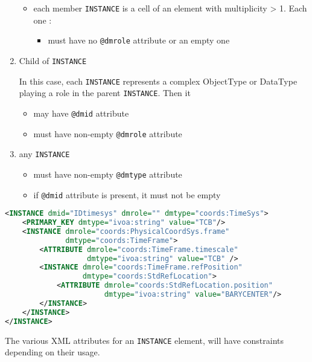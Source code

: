 \begin{enumerate}
\begin{itemize}
     \item each member \texttt{INSTANCE} is a cell of an element with multiplicity > 1.
          Each one :             
           \begin{itemize}
             \item must have no  \texttt{@dmrole} attribute or an empty one
           \end{itemize}
  \end{itemize}  
    
\item Child of \texttt{INSTANCE}

     In this case, each \texttt{INSTANCE} represents 
     a complex ObjectType or DataType playing a role in the parent \texttt{INSTANCE}.
     Then it     
     \begin{itemize}
        \item may have  \texttt{@dmid} attribute
        \item must have non-empty  \texttt{@dmrole} attribute
     \end{itemize}
           
\item any \texttt{INSTANCE}

   \begin{itemize}
   	 \item must have non-empty  \texttt{@dmtype} attribute
	 \item if  \texttt{@dmid} attribute is present, it must not be empty    
    \end{itemize}
\end{enumerate}  
    
   
\begin{lstlisting}[caption={Example of \texttt{INSTANCE} child of \texttt{INSTANCE} (see \ref{INSTANCE_snippet}).},language=XML]
 <INSTANCE dmid="IDtimesys" dmrole="" dmtype="coords:TimeSys">
    <PRIMARY_KEY dmtype="ivoa:string" value="TCB"/>
    <INSTANCE dmrole="coords:PhysicalCoordSys.frame" 
              dmtype="coords:TimeFrame">
        <ATTRIBUTE dmrole="coords:TimeFrame.timescale" 
                   dmtype="ivoa:string" value="TCB" />
        <INSTANCE dmrole="coords:TimeFrame.refPosition" 
                  dmtype="coords:StdRefLocation">
            <ATTRIBUTE dmrole="coords:StdRefLocation.position" 
                       dmtype="ivoa:string" value="BARYCENTER"/>
        </INSTANCE>
    </INSTANCE>
</INSTANCE>
\end{lstlisting}   
   
The various XML attributes for an \texttt{INSTANCE} element, will have constraints depending on their usage.
  
